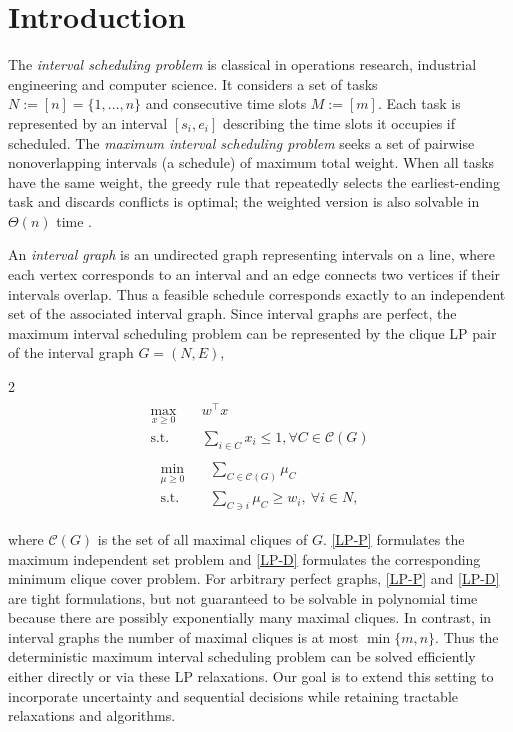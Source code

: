 \documentclass[final,5p,times,twocolumn]{elsarticle}
\newcommand{\st}{\text{s.t.}}
\begin{document}


\section{Introduction}
The \emph{interval scheduling problem} is classical in operations research, industrial engineering and computer science.
It considers a set of tasks $N:=[n] = \{1, \dotsc, n\}$ and consecutive time slots $M:=[m]$.
Each task is represented by an interval $[s_i,e_i]$ describing the time slots it occupies if scheduled.
The \emph{maximum interval scheduling problem} seeks a set of pairwise nonoverlapping intervals (a schedule) of maximum total weight.
When all tasks have the same weight, the greedy rule that repeatedly selects the earliest-ending task and discards conflicts is optimal;
the weighted version is also solvable in $\Theta(n)$ time \cite{Kleinberg+Tardos:06a}.

An \emph{interval graph} is an undirected graph representing intervals on a line, where each vertex corresponds to an interval and an edge connects two vertices if their intervals overlap.
Thus a feasible schedule corresponds exactly to an independent set of the associated interval graph.
Since interval graphs are perfect, the maximum interval scheduling problem can be represented by the clique LP pair of the interval graph $G=(N,E)$,
\begin{multicols}{2}
    \noindent
    \begin{align}
\label{LP-P}
\tag{LP-P}
\begin{split}
    \max_{x\geq 0}\quad &w^\top x\\
    \st\quad &\sum_{i\in C}x_i\leq 1, \forall C\in\mathcal{C}(G)
\end{split}
\end{align}
\columnbreak
\begin{align}
\label{LP-D}
\tag{LP-D}
\begin{split}
    \min_{\mu\geq0}\quad &\sum_{C\in\mathcal{C}(G)}\mu_C\\
    \text{s.t.}\quad &\sum_{C\ni i}\mu_C\geq w_i,~\forall i\in N,
\end{split}
\end{align}
\end{multicols}
\noindent
where $\mathcal{C}(G)$ is the set of all maximal cliques of $G$.
\eqref{LP-P} formulates the maximum independent set problem and \eqref{LP-D} formulates the corresponding minimum clique cover problem.
For arbitrary perfect graphs, \eqref{LP-P} and \eqref{LP-D} are tight formulations, but not guaranteed to be solvable in polynomial time because there are possibly exponentially many maximal cliques.
In contrast, in interval graphs the number of maximal cliques is at most $\min\{m, n\}$.
Thus the deterministic maximum interval scheduling problem can be solved efficiently either directly or via these LP relaxations.
Our goal is to extend this setting to incorporate uncertainty and sequential decisions while retaining tractable relaxations and algorithms.
\end{document}
